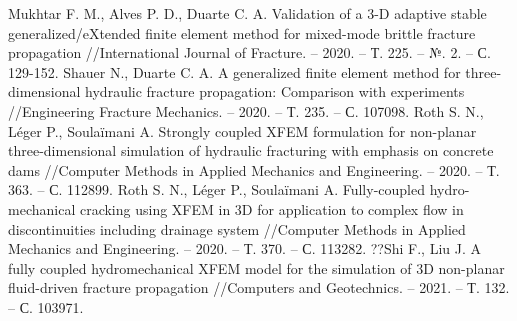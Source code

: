 \begin{thebibliography}{3}
Mukhtar F. M., Alves P. D., Duarte C. A. Validation of a 3-D adaptive stable generalized/eXtended finite element method for mixed-mode brittle fracture propagation //International Journal of Fracture. – 2020. – Т. 225. – №. 2. – С. 129-152.
Shauer N., Duarte C. A. A generalized finite element method for three-dimensional hydraulic fracture propagation: Comparison with experiments //Engineering Fracture Mechanics. – 2020. – Т. 235. – С. 107098.
Roth S. N., Léger P., Soulaïmani A. Strongly coupled XFEM formulation for non-planar three-dimensional simulation of hydraulic fracturing with emphasis on concrete dams //Computer Methods in Applied Mechanics and Engineering. – 2020. – Т. 363. – С. 112899.
Roth S. N., Léger P., Soulaïmani A. Fully-coupled hydro-mechanical cracking using XFEM in 3D for application to complex flow in discontinuities including drainage system //Computer Methods in Applied Mechanics and Engineering. – 2020. – Т. 370. – С. 113282.
??Shi F., Liu J. A fully coupled hydromechanical XFEM model for the simulation of 3D non-planar fluid-driven fracture propagation //Computers and Geotechnics. – 2021. – Т. 132. – С. 103971.


\end{thebibliography}
